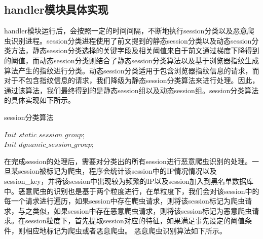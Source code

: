 \documentclass[doctor,privacy,twoside]{buaa_mac}
\begin{document}
\subsection{handler模块具体实现}
handler模块运行后，会按照一定的时间间隔，不断地执行session分类以及恶意爬虫识别进程。session分类进程使用了前文提到的静态session分类以及动态session分类方法，静态session分类选择的关键字段及相关阈值来自于前文通过梯度下降得到的阈值，而动态session分类则结合了静态session分类算法以及基于浏览器指纹生成算法产生的指纹进行分类。动态session分类适用于包含浏览器指纹信息的请求，而对于不包含指纹信息的请求，我们降级为静态session分类算法来进行处理。因此，通过该算法，我们最终得到的是静态session组以及动态session组。session分类算法的具体实现如下所示。

\begin{algorithm}[!h]
  \caption{session分类算法}
  

$Init$  $static\_{}session\_{}group$;\\
$Init$  $dynamic\_{}session\_{}group$;\\

 
\end{algorithm}

在完成session的处理后，需要对分类出的所有session进行恶意爬虫识别的处理。一旦某session被标记为爬虫，程序会统计该session中的IP情况情况以及session\_{}key，并将该session中出现较为频繁的IP以及session加入到黑名单数据库中。恶意爬虫的识别也是基于两个粒度进行，在单粒度下，我们会对该session中的每一个请求进行遍历，如果session中存在爬虫请求，则将该session标记为爬虫请求，与之类似，如果session中存在恶意爬虫请求，则将该session标记为恶意爬虫请求。在session粒度下，首先提取session对应的特征，如果满足事先设定的阈值条件，则相应地标记为爬虫或者恶意爬虫。 恶意爬虫识别算法如下所示。
\end{document}
